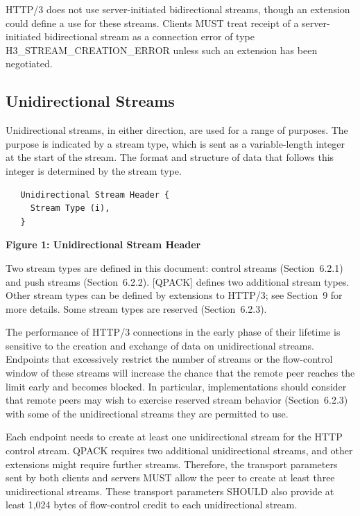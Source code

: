 \documentclass{article}
\begin{document}
HTTP/3 does not use server-initiated bidirectional streams, though an extension could define a use for these streams.  Clients MUST treat receipt of a server-initiated bidirectional stream as a connection error of type H3\_STREAM\_CREATION\_ERROR unless such an extension has been negotiated.

\subsection{Unidirectional Streams}

Unidirectional streams, in either direction, are used for a range of purposes.  The purpose is indicated by a stream type, which is sent as a variable-length integer at the start of the stream.  The format and structure of data that follows this integer is determined by the stream type.

\begin{verbatim}
   Unidirectional Stream Header {
     Stream Type (i),
   }
\end{verbatim}

\begin{center}
\textbf{Figure 1: Unidirectional Stream Header}
\end{center}

Two stream types are defined in this document: control streams (Section~6.2.1) and push streams (Section~6.2.2).  [QPACK] defines two additional stream types.  Other stream types can be defined by extensions to HTTP/3; see Section~9 for more details.  Some stream types are reserved (Section~6.2.3).

The performance of HTTP/3 connections in the early phase of their lifetime is sensitive to the creation and exchange of data on unidirectional streams.  Endpoints that excessively restrict the number of streams or the flow-control window of these streams will increase the chance that the remote peer reaches the limit early and becomes blocked.  In particular, implementations should consider that remote peers may wish to exercise reserved stream behavior (Section~6.2.3) with some of the unidirectional streams they are permitted to use.

Each endpoint needs to create at least one unidirectional stream for the HTTP control stream.  QPACK requires two additional unidirectional streams, and other extensions might require further streams.  Therefore, the transport parameters sent by both clients and servers MUST allow the peer to create at least three unidirectional streams.  These transport parameters SHOULD also provide at least 1,024 bytes of flow-control credit to each unidirectional stream.
\end{document}
